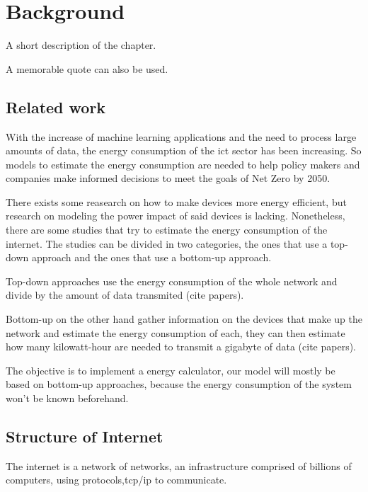 

\chapter{Background}
\label{chapter:background}

\begin{introduction}
A short description of the chapter.

A memorable quote can also be used.
\end{introduction}


\section{Related work}

With the increase of machine learning applications and the need to process large amounts of data, the energy consumption of the \ac{ict} sector has been increasing. So models to estimate the energy consumption are needed to help policy makers and companies make informed decisions to meet the goals of Net Zero by 2050.

There exists some reasearch on how to make devices more energy efficient, but research on modeling the power impact of said devices is lacking. Nonetheless, there are some studies that try to estimate the energy consumption of the internet. The studies can be divided in two categories, the ones that use a top-down approach and the ones that use a bottom-up approach.

Top-down approaches use the energy consumption of the whole network and divide by the amount of data transmited (cite papers).

Bottom-up on the other hand gather information on the devices that make up the network and estimate the energy consumption of each, they can then estimate how many \ac{kilowatt-hour} are needed to transmit a \ac{gigabyte} of data (cite papers).

The objective is to implement a  energy calculator, our model will mostly be based on bottom-up approaches, because the energy consumption of the system won't be known beforehand.


\section{Structure of Internet}

The internet is a network of networks, an infrastructure comprised of billions of computers, 
using protocols,\ac{tcp}/\ac{ip} to communicate.


